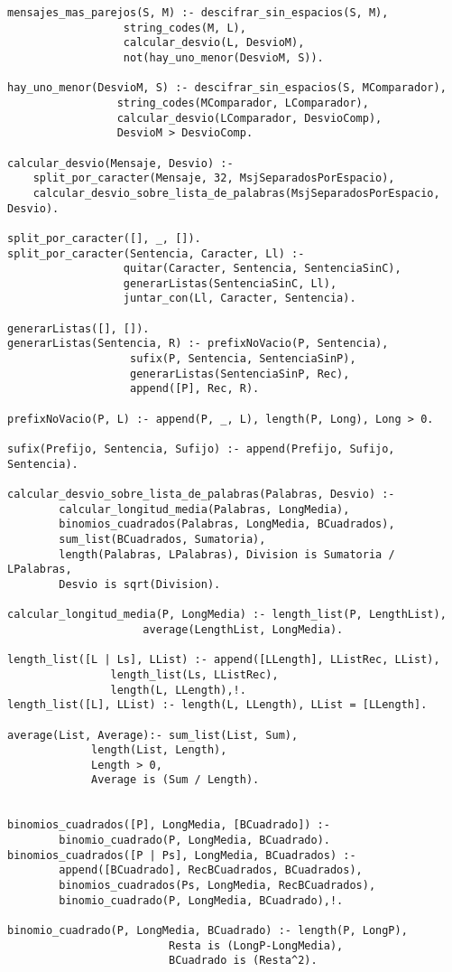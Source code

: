 \documentclass[spanish, 10pt,a4paper]{article}
\numberwithin{equation}{section} %
\begin{document}
\begin{lstlisting}
mensajes_mas_parejos(S, M) :- descifrar_sin_espacios(S, M), 
			      string_codes(M, L),
  			      calcular_desvio(L, DesvioM), 
			      not(hay_uno_menor(DesvioM, S)).

hay_uno_menor(DesvioM, S) :- descifrar_sin_espacios(S, MComparador),
			     string_codes(MComparador, LComparador),
			     calcular_desvio(LComparador, DesvioComp),
			     DesvioM > DesvioComp.

calcular_desvio(Mensaje, Desvio) :- 
	split_por_caracter(Mensaje, 32, MsjSeparadosPorEspacio), 
	calcular_desvio_sobre_lista_de_palabras(MsjSeparadosPorEspacio, Desvio).

split_por_caracter([], _, []).
split_por_caracter(Sentencia, Caracter, Ll) :-
			      quitar(Caracter, Sentencia, SentenciaSinC), 
			      generarListas(SentenciaSinC, Ll),
			      juntar_con(Ll, Caracter, Sentencia).

generarListas([], []).
generarListas(Sentencia, R) :- prefixNoVacio(P, Sentencia), 
			       sufix(P, Sentencia, SentenciaSinP), 
			       generarListas(SentenciaSinP, Rec), 
			       append([P], Rec, R).

prefixNoVacio(P, L) :- append(P, _, L), length(P, Long), Long > 0.

sufix(Prefijo, Sentencia, Sufijo) :- append(Prefijo, Sufijo, Sentencia).

calcular_desvio_sobre_lista_de_palabras(Palabras, Desvio) :- 
		calcular_longitud_media(Palabras, LongMedia), 
		binomios_cuadrados(Palabras, LongMedia, BCuadrados), 
		sum_list(BCuadrados, Sumatoria), 
		length(Palabras, LPalabras), Division is Sumatoria / LPalabras, 
		Desvio is sqrt(Division).

calcular_longitud_media(P, LongMedia) :- length_list(P, LengthList), 
					 average(LengthList, LongMedia).

length_list([L | Ls], LList) :- append([LLength], LListRec, LList), 
				length_list(Ls, LListRec),
				length(L, LLength),!. 
length_list([L], LList) :- length(L, LLength), LList = [LLength].

average(List, Average):- sum_list(List, Sum), 
			 length(List, Length), 
			 Length > 0, 
			 Average is (Sum / Length).


binomios_cuadrados([P], LongMedia, [BCuadrado]) :- 
		binomio_cuadrado(P, LongMedia, BCuadrado). 
binomios_cuadrados([P | Ps], LongMedia, BCuadrados) :- 
		append([BCuadrado], RecBCuadrados, BCuadrados), 
		binomios_cuadrados(Ps, LongMedia, RecBCuadrados), 
		binomio_cuadrado(P, LongMedia, BCuadrado),!.

binomio_cuadrado(P, LongMedia, BCuadrado) :- length(P, LongP), 
					     Resta is (LongP-LongMedia), 
					     BCuadrado is (Resta^2).
											 
\end{lstlisting}


\end{document}
